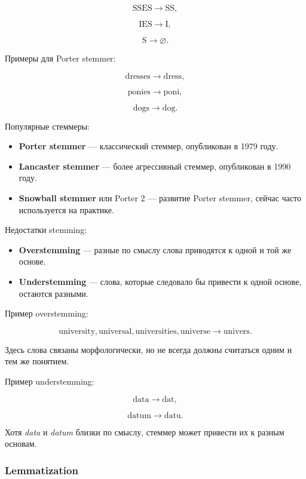 \documentclass[a4paper,12pt]{article}
\begin{document}
\[
\text{SSES} \rightarrow \text{SS},
\]

\[
\text{IES} \rightarrow \text{I},
\]

\[
\text{S} \rightarrow \varnothing.
\]

Примеры для Porter stemmer:

\[
\text{dresses} \rightarrow \text{dress},
\]

\[
\text{ponies} \rightarrow \text{poni},
\]

\[
\text{dogs} \rightarrow \text{dog}.
\]

Популярные стеммеры:

\begin{itemize}
    \item \textbf{Porter stemmer} --- классический стеммер, опубликован в 1979 году.
    \item \textbf{Lancaster stemmer} --- более агрессивный стеммер, опубликован в 1990 году.
    \item \textbf{Snowball stemmer} или Porter 2 --- развитие Porter stemmer, сейчас часто используется на практике.
\end{itemize}

Недостатки stemming:

\begin{itemize}
    \item \textbf{Overstemming} --- разные по смыслу слова приводятся к одной и той же основе.
    \item \textbf{Understemming} --- слова, которые следовало бы привести к одной основе, остаются разными.
\end{itemize}

Пример overstemming:

\[
\text{university}, \text{universal}, \text{universities}, \text{universe}
\longrightarrow
\text{univers}.
\]

Здесь слова связаны морфологически, но не всегда должны считаться одним и тем же понятием.

Пример understemming:

\[
\text{data} \rightarrow \text{dat},
\]

\[
\text{datum} \rightarrow \text{datu}.
\]

Хотя \textit{data} и \textit{datum} близки по смыслу, стеммер может привести их к разным основам.

\subsubsection{Lemmatization}
\end{document}
